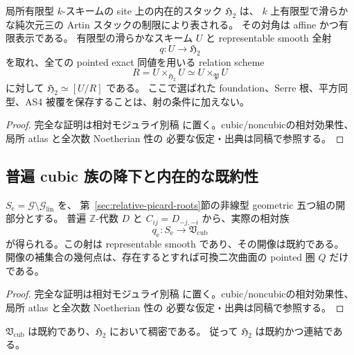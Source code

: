 \begin{theorem}
\label{thm:global-h2-smooth-finite-type}
局所有限型 $k$-スキームの site 上の内在的スタック $\mathfrak H_2$ は、
$k$ 上有限型で滑らかな純次元三の Artin スタックの制限により表される。
その対角は affine かつ有限表示である。
有限型の滑らかなスキーム $U$ と representable smooth 全射
\[
 q:U\longrightarrow\mathfrak H_2
\]
を取れ、全ての pointed exact 同値を用いる relation scheme
\[
 R=U\times_{\mathfrak H_2}U
   \simeq U\times_{\mathfrak P}U
\]
に対して $\mathfrak H_2\simeq[U/R]$ である。
ここで選ばれた foundation、Serre 根、平方同型、AS4 被覆を保存することは、射の条件に加えない。
\end{theorem}

\begin{proof}
完全な証明は相対モジュライ別稿
\cite[内在的モジュライの有限型代数性・滑らかさ・境界]{QuadricModuli2026}
に置く。cubic/noncubicの相対効果性、局所 atlas と全次数 Noetherian 性の
必要な仮定・出典は同稿で参照する。
\end{proof}

\subsection{普遍 cubic 族の降下と内在的な既約性}

\begin{lemma}
\label{lem:universal-nonlinear-cubic-h2-family}
$S_{\mathrm e}=\mathscr G\setminus\mathscr G_{\mathrm{lin}}$ を、
第~\ref{sec:relative-picard-roots}節の非線型 geometric 五つ組の開部分とする。
普遍 $\mathbb Z$-代数 $D$ と $C_{ij}=D_{-j,-i}$ から、実際の相対族
\[
 q_{\mathrm e}:S_{\mathrm e}\longrightarrow\mathfrak V_{\mathrm{cub}}
\]
が得られる。この射は representable smooth であり、その開像は既約である。
開像の補集合の幾何点は、存在するとすれば可換二次曲面の pointed 圏 $Q$ だけである。
\end{lemma}

\begin{proof}
完全な証明は相対モジュライ別稿
\cite[内在的モジュライの有限型代数性・滑らかさ・境界]{QuadricModuli2026}
に置く。cubic/noncubicの相対効果性、局所 atlas と全次数 Noetherian 性の
必要な仮定・出典は同稿で参照する。
\end{proof}

\begin{proposition}[全内在的モジュライの既約性]
\label{prop:global-h2-irreducible}
$\mathfrak V_{\mathrm{cub}}$ は既約であり、$\mathfrak H_2$ において稠密である。
従って $\mathfrak H_2$ は既約かつ連結である。
\end{proposition}

